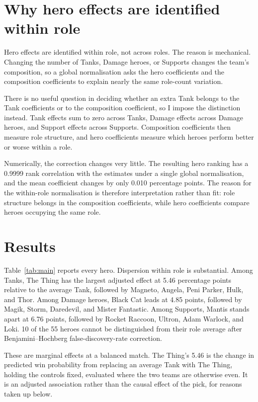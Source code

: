 \documentclass[11pt]{article}
\begin{document}
\FloatBarrier
\section*{Why hero effects are identified within role}

Hero effects are identified within role, not across roles. The reason is mechanical. Changing
the number of Tanks, Damage heroes, or Supports changes the team's composition, so a global
normalisation asks the hero coefficients and the composition coefficients to explain nearly the
same role-count variation.

There is no useful question in deciding whether an extra Tank belongs to the Tank coefficients
or to the composition coefficient, so I impose the distinction instead. Tank effects sum to zero
across Tanks, Damage effects across Damage heroes, and Support effects across Supports.
Composition coefficients then measure role structure, and hero coefficients measure which heroes
perform better or worse within a role.

Numerically, the correction changes very little. The resulting hero ranking has a
0.9999 rank correlation with the estimates under a single global normalisation, and the
mean coefficient changes by only 0.010 percentage points. The reason for the within-role
normalisation is therefore interpretation rather than fit: role structure belongs in the
composition coefficients, while hero coefficients compare heroes occupying the same role.

\FloatBarrier
\section*{Results}

Table~\ref{tab:main} reports every hero. Dispersion within role is substantial. Among Tanks,
The Thing has the largest adjusted effect at 5.46 percentage points relative to the average
Tank, followed by Magneto, Angela, Peni Parker, Hulk, and Thor. Among Damage heroes, Black Cat leads at 4.85 points, followed by
Magik, Storm, Daredevil, and Mister Fantastic. Among Supports, Mantis stands apart at 6.76 points, followed by Rocket Raccoon, Ultron, Adam Warlock, and Loki.
10 of the 55 heroes cannot be distinguished from their role average after
Benjamini--Hochberg false-discovery-rate correction.

These are marginal effects at a balanced match. The Thing's 5.46 is the change in predicted win
probability from replacing an average Tank with The Thing, holding the controls fixed, evaluated
where the two teams are otherwise even. It is an adjusted association rather than the causal
effect of the pick, for reasons taken up below.
\end{document}
